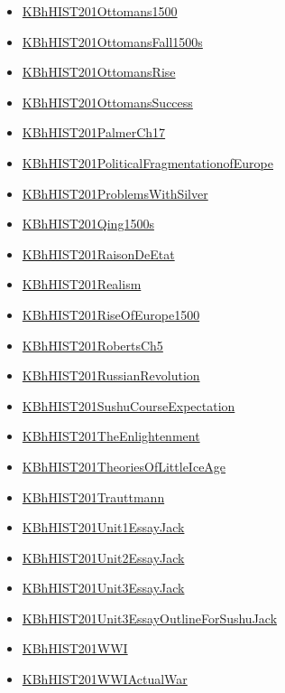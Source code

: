 \documentclass[11pt]{article}
\begin{document}
\begin{itemize}
\begin{itemize}
\item \href{hist201/KBhHIST201Ottomans1500.org}{KBhHIST201Ottomans1500}
\item \href{hist201/KBhHIST201OttomansFall1500s.org}{KBhHIST201OttomansFall1500s}
\item \href{hist201/KBhHIST201OttomansRise.org}{KBhHIST201OttomansRise}
\item \href{hist201/KBhHIST201OttomansSuccess.org}{KBhHIST201OttomansSuccess}
\item \href{hist201/KBhHIST201PalmerCh17.org}{KBhHIST201PalmerCh17}
\item \href{hist201/KBhHIST201PoliticalFragmentationofEurope.org}{KBhHIST201PoliticalFragmentationofEurope}
\item \href{hist201/KBhHIST201ProblemsWithSilver.org}{KBhHIST201ProblemsWithSilver}
\item \href{hist201/KBhHIST201Qing1500s.org}{KBhHIST201Qing1500s}
\item \href{hist201/KBhHIST201RaisonDeEtat.org}{KBhHIST201RaisonDeEtat}
\item \href{hist201/KBhHIST201Realism.org}{KBhHIST201Realism}
\item \href{hist201/KBhHIST201RiseOfEurope1500.org}{KBhHIST201RiseOfEurope1500}
\item \href{hist201/KBhHIST201RobertsCh5.org}{KBhHIST201RobertsCh5}
\item \href{hist201/KBhHIST201RussianRevolution.org}{KBhHIST201RussianRevolution}
\item \href{hist201/KBhHIST201SushuCourseExpectation.org}{KBhHIST201SushuCourseExpectation}
\item \href{hist201/KBhHIST201TheEnlightenment.org}{KBhHIST201TheEnlightenment}
\item \href{hist201/KBhHIST201TheoriesOfLittleIceAge.org}{KBhHIST201TheoriesOfLittleIceAge}
\item \href{hist201/KBhHIST201Trauttmann.org}{KBhHIST201Trauttmann}
\item \href{hist201/KBhHIST201Unit1EssayJack.org}{KBhHIST201Unit1EssayJack}
\item \href{hist201/KBhHIST201Unit2EssayJack.org}{KBhHIST201Unit2EssayJack}
\item \href{hist201/KBhHIST201Unit3EssayJack.org}{KBhHIST201Unit3EssayJack}
\item \href{hist201/KBhHIST201Unit3EssayOutlineForSushuJack.org}{KBhHIST201Unit3EssayOutlineForSushuJack}
\item \href{hist201/KBhHIST201WWI.org}{KBhHIST201WWI}
\item \href{hist201/KBhHIST201WWIActualWar.org}{KBhHIST201WWIActualWar}

\end{itemize}
\end{itemize}
\end{document}
